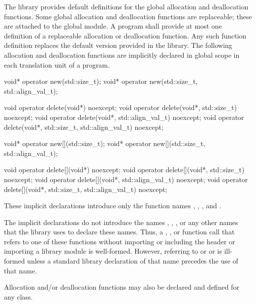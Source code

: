 \pnum
The library provides default definitions for the global allocation and
deallocation functions. Some global allocation and deallocation
functions are replaceable;
these are attached to the global module.
A \Cpp{} program shall
provide at most one definition of a replaceable allocation or
deallocation function. Any such function definition replaces the default
version provided in the library. The
following allocation and deallocation functions
are implicitly declared in global scope in each translation unit of a
program.

\begin{codeblock}
void* operator new(std::size_t);
void* operator new(std::size_t, std::align_val_t);

void operator delete(void*) noexcept;
void operator delete(void*, std::size_t) noexcept;
void operator delete(void*, std::align_val_t) noexcept;
void operator delete(void*, std::size_t, std::align_val_t) noexcept;

void* operator new[](std::size_t);
void* operator new[](std::size_t, std::align_val_t);

void operator delete[](void*) noexcept;
void operator delete[](void*, std::size_t) noexcept;
void operator delete[](void*, std::align_val_t) noexcept;
void operator delete[](void*, std::size_t, std::align_val_t) noexcept;
\end{codeblock}

These implicit declarations introduce only the function names
,
,
, and
.
\begin{note}
The implicit declarations do not introduce
the names ,
,
,
or any other names that the library uses to
declare these names. Thus, a ,
, or function call that refers to one of
these functions without importing or including the header 
or importing a \Cpp{} library module
is well-formed. However, referring to 
or 
or 
is ill-formed unless
a standard library declaration
of that name precedes the use of that name.
\end{note}
Allocation and/or
deallocation functions may also be declared and defined for any
class.

